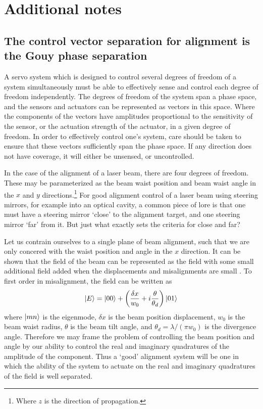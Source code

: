 \chapter{Additional notes}

\section{The control vector separation for alignment is the Gouy phase separation}
\label{sec:gouysep}
A servo system which is designed to control several degrees of freedom of a system simultaneously must be able to effectively sense and control each degree of freedom independently. %
The degrees of freedom of the system span a phase space, and the sensors and actuators can be represented as vectors in this space. %
Where the components of the vectors have amplitudes proportional to the sensitivity of the sensor, or the actuation strength of the actuator, in a given degree of freedom. %
In order to effectively control one's system, care should be taken to ensure that these vectors sufficiently span the phase space. %
If any direction does not have coverage, it will either be unsensed, or uncontrolled.

In the case of the alignment of a laser beam, there are four degrees of freedom. %
These may be parameterized as the beam waist position and beam waist angle in the $x$ and $y$ directions.\footnote{Where $z$ is the direction of propagation.} For good alignment control of a laser beam using steering mirrors, for example into an optical cavity, a common piece of lore is that one must have a steering mirror `close' to the alignment target, and one steering mirror `far' from it. %
But just what exactly sets the criteria for close and far?

Let us contrain ourselves to a single plane of beam alignment, such that we are only concered with the waist position and angle in the $x$ direction. %
It can be shown that the field of the beam can be represented as the  field with some small additional  field added when the displacements and misalignments are small \cite{Anderson1984}. %
To first order in misalignment, the field can be written as
\begin{equation}
\label{eqn:shifttilt}
\left| E \right>=\left| 00 \right>+\left(\frac{\delta x}{w_0} + i \frac{\theta}{\theta_d}\right)\left| 01 \right>
\end{equation}
where $\left| mn \right>$ is the  eigenmode, $\delta x$ is the beam position displacement, $w_0$ is the beam waist radius, $\theta$ is the beam tilt angle, and $\theta_d=\lambda/(\pi w_0)$ is the divergence angle. %
Therefore we may frame the problem of controlling the beam position and angle by our ability to control the real and imaginary quadratures of the amplitude of the  component. %
Thus a `good' alignment system will be one in which the ability of the system to actuate on the real and imaginary quadratures of the  field is well separated.

